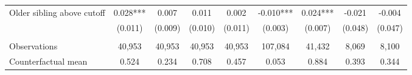 {{\begin{tabular}{lcccccccc}
Older sibling above cutoff&       0.028***&       0.007   &       0.011   &       0.002   &      -0.010***&       0.024***&      -0.021   &      -0.004   \\
                    &     (0.011)   &     (0.009)   &     (0.010)   &     (0.011)   &     (0.003)   &     (0.007)   &     (0.048)   &     (0.047)   \\
                    &               &               &               &               &               &               &               &               \\
Observations        &      40,953   &      40,953   &      40,953   &      40,953   &     107,084   &      41,432   &       8,069   &       8,100   \\
Counterfactual mean &       0.524   &       0.234   &       0.708   &       0.457   &       0.053   &       0.884   &       0.393   &       0.344   \\
 

\bottomrule
\end{tabular}
}
}
